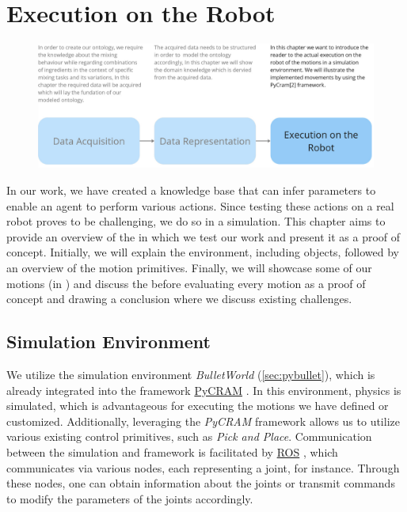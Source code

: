 \chapter{Execution on the Robot}
\label{chap:Execution on the robot}
\begin{figure}[H]
    \includegraphics[scale=0.25]{Graphics/structure_overview3.jpg}
\end{figure}
In our work, we have created a knowledge base that can infer parameters to enable an agent to perform various actions.
Since testing these actions on a real robot proves to be challenging, we do so in a simulation.
This chapter aims to provide an overview of the  in which we test our work and present it as a proof of concept.
Initially, we will explain the environment, including objects, followed by an overview of the motion primitives.
Finally, we will showcase some of our motions (in ) and discuss the  before evaluating every motion as a proof of concept and drawing a conclusion where we discuss existing challenges.

\section{Simulation Environment}
\label{sec:simulation environment}

We utilize the simulation environment \textit{BulletWorld} (\ref{sec:pybullet}), which is already integrated into the framework \hyperref[sec:pycram]{PyCRAM} \cite{pycram} . 
In this environment, physics is simulated, which is advantageous for executing the motions we have defined or customized. Additionally, leveraging the \textit{PyCRAM} \cite{pycram} framework allows us to utilize various existing control primitives, such as \textit{Pick and Place}. Communication between the simulation and framework is facilitated by \hyperref[sec:ROS]{ROS} \cite{ros} , which communicates via various nodes, each representing a joint, for instance. Through these nodes, one can obtain information about the joints or transmit commands to modify the parameters of the joints accordingly.


